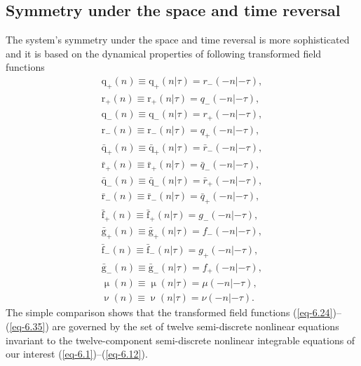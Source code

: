 \documentclass[10pt,a4paper]{amsart}
\numberwithin{equation}{section}
\begin{document}
\subsection{Symmetry under the space and time reversal}
The system's symmetry under the space and time reversal is more sophisticated and it is based on the dynamical properties of following transformed field functions
\begin{gather}\label{eq-6.24}
	\mathrm{q}_{+}(n)\equiv\mathrm{q}_{+}(n|\tau)=r_{-}(-n|-\tau),
\\ \label{eq-6.25}
	\mathrm{r}_{+}(n)\equiv\mathrm{r}_{+}(n|\tau)=q_{-}(-n|-\tau),
\\ \label{eq-6.26}
	\mathrm{q}_{-}(n)\equiv\mathrm{q}_{-}(n|\tau)=r_{+}(-n|-\tau),
\\ \label{eq-6.27}
	\mathrm{r}_{-}(n)\equiv\mathrm{r}_{-}(n|\tau)=q_{+}(-n|-\tau),
\\ \label{eq-6.28}
	\bar{\mathrm{q}}_{+}(n)\equiv\bar{\mathrm{q}}_{+}(n|\tau)=\bar{r}_{-}(-n|-\tau),
\\ \label{eq-6.29}
	\bar{\mathrm{r}}_{+}(n)\equiv\bar{\mathrm{r}}_{+}(n|\tau)=\bar{q}_{-}(-n|-\tau),
\\ \label{eq-6.30}
	\bar{\mathrm{q}}_{-}(n)\equiv\bar{\mathrm{q}}_{-}(n|\tau)=\bar{r}_{+}(-n|-\tau),
\\ \label{eq-6.31}
	\bar{\mathrm{r}}_{-}(n)\equiv\bar{\mathrm{r}}_{-}(n|\tau)=\bar{q}_{+}(-n|-\tau),
\\ \label{eq-6.32}
	\bar{\mathrm{f}}_{+}(n)\equiv\bar{\mathrm{f}}_{+}(n|\tau)=g_{-}(-n|-\tau),
\\ \label{eq-6.33}
	\bar{\mathrm{g}}_{+}(n)\equiv\bar{\mathrm{g}}_{+}(n|\tau)=f_{-}(-n|-\tau),
\\ \label{eq-6.34}
	\bar{\mathrm{f}}_{-}(n)\equiv\bar{\mathrm{f}}_{-}(n|\tau)=g_{+}(-n|-\tau),
\\ \label{eq-6.35}
	\bar{\mathrm{g}}_{-}(n)\equiv\bar{\mathrm{g}}_{-}(n|\tau)=f_{+}(-n|-\tau),
\\ %
\upmu (n)\equiv\upmu(n|\tau)=\mu(-n|-\tau), \nonumber
\\ %
	\upnu(n)\equiv\upnu(n|\tau)=\nu(-n|-\tau) . \nonumber
\end{gather}
The simple comparison shows that the transformed field functions (\ref{eq-6.24})--(\ref{eq-6.35}) are governed by the set of twelve semi-discrete nonlinear equations invariant to the twelve-component semi-discrete nonlinear integrable equations of our interest (\ref{eq-6.1})--(\ref{eq-6.12}).
\end{document}
